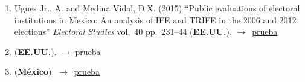 \documentclass[12 pt, letter]{article}
\newenvironment{CitasMiTrabajo}{
    \begin{footnotesize}
    \begin{enumerate}[label={\footnotesize\emph{cita~\arabic*}},ref=\arabic*] %
        \setlength{\itemsep}{.1\itemsep}
        \setlength{\parskip}{.1\parskip}
    }{\end{enumerate}\end{footnotesize}}
\begin{document}
\begin{CitasMiTrabajo}
        \item Ugues Jr., A. and Medina Vidal, D.X. (2015)
            ``Public evaluations of electoral institutions in Mexico: An analysis of IFE and TRIFE in the 2006 and 2012 elections''
            \emph{Electoral Studies}
            vol.\ 40 pp.\ 231--44 (\textbf{EE.UU.}). $\rightarrow$~\href{https://github.com/emagar/cv/blob/master/citasMiTrab/estevezEtalElecStud/ugues.medinaPubEvalElectoralInstitutionsMexico2015es.excerpt.pdf}{prueba}

        \item {} (\textbf{EE.UU.}).  $\rightarrow$ \href{https://journals.sagepub.com/doi/full/10.1177/0192512119834573}{prueba}
            
        \label{ncites:estevez.magar.rosas.2008} %

        \item {} (\textbf{M\'exico}).  $\rightarrow$~\href{https://github.com/emagar/cv/blob/master/citasMiTrab/estevezEtalElecStud/faustino-torres-ife-disenho2015ep.pdf}{prueba}
        

\end{CitasMiTrabajo}
\end{document}
